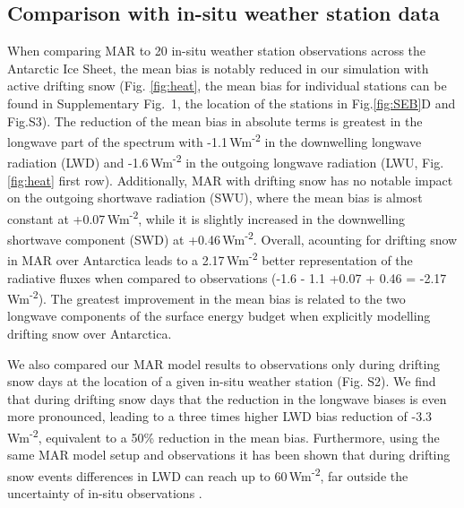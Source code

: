 \documentclass[draft]{agujournal2019}
\begin{document}
\subsection{Comparison with in-situ weather station data}

When comparing MAR to 20 in-situ weather station observations across the Antarctic Ice Sheet, the mean bias is notably reduced in our simulation with active drifting snow (Fig. \ref{fig:heat}, the mean bias for individual stations can be found in Supplementary Fig.~1, the location of the stations in Fig.\ref{fig:SEB}D and Fig.S3). The reduction of the mean bias in absolute terms is greatest in the longwave part of the spectrum with -1.1\,Wm\textsuperscript{-2} in the downwelling longwave radiation (LWD) and -1.6\,Wm\textsuperscript{-2} in the outgoing longwave radiation (LWU, Fig. \ref{fig:heat} first row). Additionally, MAR with drifting snow has no notable impact on the outgoing shortwave radiation (SWU), where the mean bias is almost constant at +0.07\,Wm\textsuperscript{-2}, while it is slightly increased in the downwelling shortwave component (SWD) at +0.46\,Wm\textsuperscript{-2}. Overall, acounting for drifting snow in MAR over Antarctica leads to a 2.17\,Wm\textsuperscript{-2} better representation of the radiative fluxes when compared to observations (-1.6 - 1.1 +0.07 + 0.46 = -2.17\,Wm\textsuperscript{-2}). The greatest improvement in the mean bias is related to the two longwave components of the surface energy budget when explicitly modelling drifting snow over Antarctica. 

We also compared our MAR model results to observations only during drifting snow days at the location of a given in-situ weather station (Fig. S2). We find that during drifting snow days that the reduction in the longwave biases is even more pronounced, leading to a three times higher LWD bias reduction of -3.3\,Wm\textsuperscript{-2}, equivalent to a 50\% reduction in the mean bias. Furthermore, using the same MAR model setup and observations it has been shown that during drifting snow events differences in LWD can reach up to 60\,Wm\textsuperscript{-2}, far outside the uncertainty of in-situ observations \cite{Letoumelin2020}.
\end{document}
